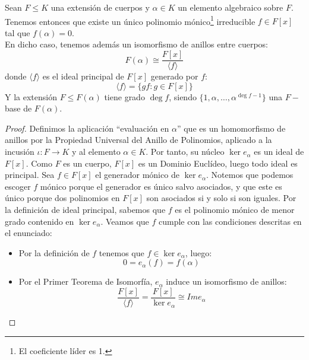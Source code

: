 \begin{prop}\label{prop:pol_irreducible}
    Sean $F\leq K$ una extensión de cuerpos y $\alpha\in K$ un elemento algebraico sobre $F$. Tenemos entonces que existe un único polinomio mónico\footnote{El coeficiente líder es 1.} irreducible $f\in F[x]$ tal que $f(\alpha)=0$.\\

    \noindent
    En dicho caso, tenemos además un isomorfismo de anillos entre cuerpos:
    \begin{equation*}
        F(\alpha) \cong \frac{F[x]}{\langle f \rangle }
    \end{equation*}
    donde $\langle f \rangle $ es el ideal principal de $F[x]$ generado por $f$:
    \begin{equation*}
        \langle f \rangle  = \{gf : g\in F[x]\}
    \end{equation*}
    Y la extensión $F\leq F(\alpha)$ tiene grado $\deg f$, siendo $\{1,\alpha,\ldots,\alpha^{\deg f - 1}\}$ una $F-$base de $F(\alpha)$.
    \begin{proof} 
        Definimos la aplicación ``evaluación en $\alpha$''
        que es un homomorfismo de anillos por la Propiedad Universal del Anillo de Polinomios, aplicado a la incusión $\iota:F\to K$ y al elemento $\alpha\in K$. Por tanto, su núcleo $\ker e_\alpha$ es un ideal de $F[x]$. Como $F$ es un cuerpo, $F[x]$ es un Dominio Euclídeo, luego todo ideal es principal. Sea $f\in F[x]$ el generador mónico de $\ker e_{\alpha}$. Notemos que podemos escoger $f$ mónico porque el generador es único salvo asociados, y que este es único porque dos polinomios en $F[x]$ son asociados si y solo si son iguales. Por la definición de ideal principal, sabemos que $f$ es el polinomio mónico de menor grado contenido en $\ker e_{\alpha}$. Veamos que $f$ cumple con las condiciones descritas en el enunciado:
        \begin{itemize}
            \item Por la definición de $f$ tenemos que $f\in \ker e_\alpha$, luego:
                \begin{equation*}
                    0 = e_\alpha(f) = f(\alpha)
                \end{equation*}
            \item Por el Primer Teorema de Isomorfía, $e_{\alpha}$ induce un isomorfismo de anillos:
                \begin{equation*}
                    \frac{F[x]}{\langle f \rangle } = \frac{F[x]}{\ker e_\alpha} \cong Im e_{\alpha}

\end{equation*}
\end{itemize}
\end{proof}
\end{prop}
